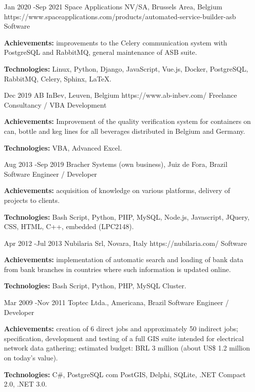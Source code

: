 \documentclass[10pt]{article} %
\begin{document}
\job
{Jan 2020 -}{Sep 2021}
{Space Applications NV/SA, Brussels Area, Belgium}
{https://www.spaceapplications.com/products/automated-service-builder-asb}
{Software }
{\rule{0mm}{2mm}\textbf{Achievements:} improvements to the Celery communication system with PostgreSQL and RabbitMQ, general maintenance of ASB suite.\\
\rule{0mm}{3mm}\textbf{Technologies:} Linux, Python, Django, JavaScript, Vue.js, Docker, PostgreSQL, RabbitMQ, Celery, Sphinx, LaTeX.}

\job
{Dec 2019}{}
{AB InBev, Leuven, Belgium}
{https://www.ab-inbev.com/}
{Freelance Consultancy / VBA Development}
{\rule{0mm}{2mm}\textbf{Achievements:} Improvement of the quality verification system for containers on can, bottle and keg lines for all beverages distributed in Belgium and Germany.\\
\rule{0mm}{3mm}\textbf{Technologies:} VBA, Advanced Excel.}

\job
{Aug 2013 -}{Sep 2019}
{Bracher Systems (own business), Juiz de Fora, Brazil}
{}
{Software Engineer / Developer}
{\rule{0mm}{2mm}\textbf{Achievements:} acquisition of knowledge on various platforms, delivery of projects to clients.\\
\rule{0mm}{3mm}\textbf{Technologies:} Bash Script, Python, PHP, MySQL, Node.js, Javascript, JQuery, CSS, HTML, C++, embedded (LPC2148).}

\job
{Apr 2012 -}{Jul 2013}
{Nubilaria Srl, Novara, Italy}
{https://nubilaria.com/}
{Software }
{\rule{0mm}{2mm}\textbf{Achievements:} implementation of automatic search and loading of bank data from bank branches in countries where such information is updated online.\\
\rule{0mm}{3mm}\textbf{Technologies:} Bash Script, Python, PHP, MySQL Cluster.}

\job
{Mar 2009 -}{Nov 2011}
{Toptec Ltda., Americana, Brazil}
{}
{Software Engineer / Developer}
{\rule{0mm}{2mm}\textbf{Achievements:} creation of 6 direct jobs and approximately 50 indirect jobs; specification, development and testing of a full GIS suite intended for electrical network data gathering; estimated budget: BRL 3 million (about US\$ 1.2 million on today’s value). \\
\rule{0mm}{3mm}\textbf{Technologies:} C\#, PostgreSQL com PostGIS, Delphi, SQLite, .NET Compact 2.0, .NET 3.0.}




\end{document}
